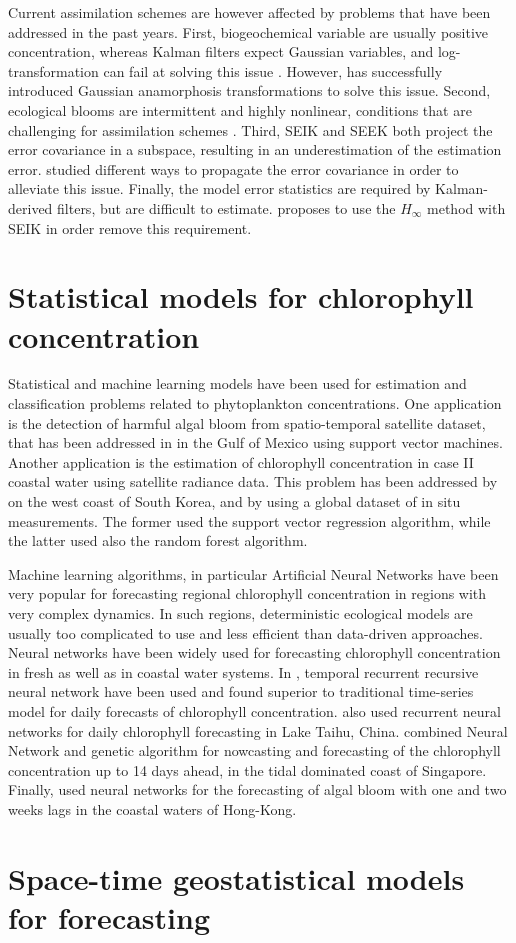 Current assimilation schemes are however affected by problems that have been addressed in the past years. First, biogeochemical variable are usually positive concentration, whereas Kalman filters expect Gaussian variables, and log-transformation can fail at solving this issue \cite{Ciavatta2011}. However, \cite{Fontana2013} has successfully introduced Gaussian anamorphosis transformations to solve this issue. Second, ecological blooms are intermittent and highly nonlinear, conditions that are challenging for assimilation schemes \cite{Triantafyllou2012, Korres2012}. Third, SEIK and SEEK both project the error covariance in a subspace, resulting in an underestimation of the estimation error. \cite{Butenschon2012} studied different ways to propagate the error covariance in order to alleviate this issue. Finally, the model error statistics are required by Kalman-derived filters, but are difficult to estimate. \cite{Triantafyllou2012} proposes to use the $H_\infty$ method with SEIK in order remove this requirement.

\section{Statistical models for chlorophyll concentration}

Statistical and machine learning models have been used for estimation and classification problems related to phytoplankton concentrations. One application is the detection of harmful algal bloom from spatio-temporal satellite dataset, that has been addressed in \cite{Gokaraju2011} in the Gulf of Mexico using support vector machines. Another application is the estimation of chlorophyll concentration in case II coastal water using satellite radiance data. This problem has been addressed by \cite{Kim2014} on the west coast of South Korea, and by \cite{Camps-Valls2006} using a global dataset of in situ measurements. The former used the support vector regression algorithm, while the latter used also the random forest algorithm.

Machine learning algorithms, in particular Artificial Neural Networks have been very popular for forecasting regional chlorophyll concentration in regions with very complex dynamics. In such regions, deterministic ecological models are usually too complicated to use and less efficient than data-driven approaches. Neural networks have been widely used for forecasting chlorophyll concentration in fresh as well as in coastal water systems. In \cite{Jeong2007}, temporal recurrent recursive neural network have been used and found superior to traditional time-series model for daily forecasts of chlorophyll concentration. \cite{Wang2013} also used recurrent neural networks for daily chlorophyll forecasting in Lake Taihu, China. \cite{Mulia2013} combined Neural Network and genetic algorithm for nowcasting and forecasting of the chlorophyll concentration up to 14 days ahead, in the tidal dominated coast of Singapore. Finally, \cite{Lee2013} used neural networks for the forecasting of algal bloom with one and two weeks lags in the coastal waters of Hong-Kong.

\section{Space-time geostatistical models for forecasting}


